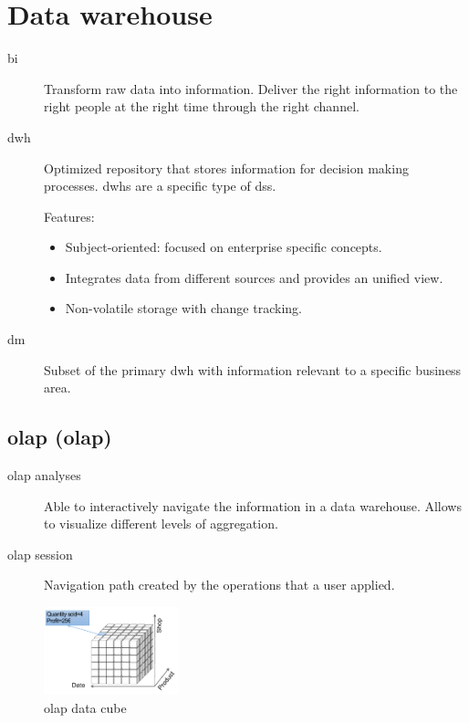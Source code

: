 \chapter{Data warehouse}


\begin{description}
    \item[\Acl{bi}] 
        Transform raw data into information.
        Deliver the right information to the right people at the right time through the right channel.

    \item[\Ac{dwh}] 
        Optimized repository that stores information for decision making processes.
        \Acp{dwh} are a specific type of \ac{dss}.

        Features:
        \begin{itemize}
            \item Subject-oriented: focused on enterprise specific concepts.
            \item Integrates data from different sources and provides an unified view.
            \item Non-volatile storage with change tracking. 
        \end{itemize}

    \item[\Ac{dm}] 
        Subset of the primary \ac{dwh} with information relevant to a specific business area.
\end{description}



\section{\Acl{olap} (\Acs{olap})}

\begin{description}
    \item[\ac{olap} analyses] 
        Able to interactively navigate the information in a data warehouse.
        Allows to visualize different levels of aggregation.

    \item[\ac{olap} session] 
        Navigation path created by the operations that a user applied.
\end{description}

\begin{figure}[ht]
    \centering
    \includegraphics[width=0.35\textwidth]{img/_olap_cube.pdf}
    \caption{\ac{olap} data cube}
\end{figure}


